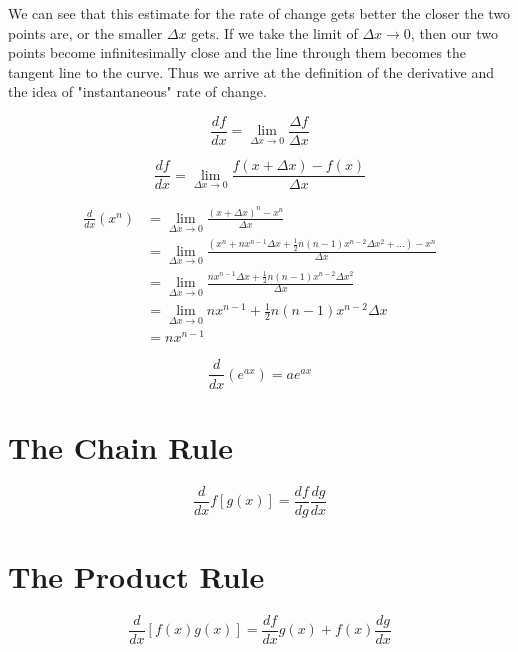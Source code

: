 We can see that this estimate for the rate of change gets better the closer the two points are, or the smaller 
$\Delta x$ gets. If we take the limit of $\Delta x \to 0$, then our two points become infinitesimally close and the
line through them becomes the tangent line to the curve. Thus we arrive at the definition of the derivative and the
idea of "instantaneous" rate of change. 

\begin{equation*}
    \frac{df}{dx} = \lim_{\Delta x \to 0} \frac{\Delta f}{\Delta x}
\end{equation*}

\begin{equation*}
    \frac{df}{dx} = \lim_{\Delta x \to 0} \frac{f(x + \Delta x) - f(x)}{\Delta x}
\end{equation*}

\begin{align*}
    \frac{d}{dx}(x^{n}) &= \lim_{\Delta x \to 0} \frac{(x + \Delta x)^{n} - x^{n}}{\Delta x}\\
    &= \lim_{\Delta x \to 0} \frac{(x^{n} + n x^{n-1}\Delta x + \frac{1}{2}n(n-1)x^{n-2}\Delta x^{2} +\dots) - x^{n}}{\Delta x}\\
    &= \lim_{\Delta x \to 0} \frac{n x^{n-1}\Delta x + \frac{1}{2}n(n-1)x^{n-2}\Delta x^{2}}{\Delta x}\\
    &= \lim_{\Delta x \to 0} n x^{n-1} + \frac{1}{2}n(n-1)x^{n-2}\Delta x\\
    &= n x^{n-1}
\end{align*}

\begin{equation*}
    \frac{d}{dx}(e^{ax}) = ae^{ax}
\end{equation*}

\section{The Chain Rule}

\begin{equation*}
    \frac{d}{dx}f[g(x)] = \frac{df}{dg} \frac{dg}{dx}
\end{equation*}

\section{The Product Rule}

\begin{equation*}
    \frac{d}{dx} \left[f(x)g(x)\right] = \frac{df}{dx} g(x) + f(x)\frac{dg}{dx}
\end{equation*}

